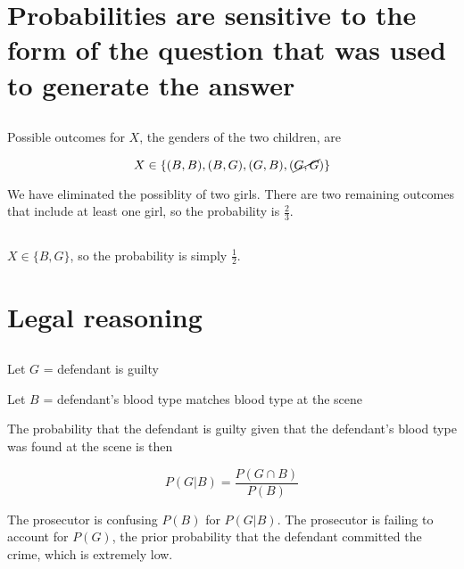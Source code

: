 \documentclass{article}
\begin{document}
\def\ci{\perp\!\!\!\perp}

\section{Probabilities are sensitive to the form of the question that
  was used to generate the answer}

\subsection{}

Possible outcomes for $X$, the genders of the two children, are

\[
X\in \left\{ (B,B), (B,G), (G,B), (\cancel{G,G})\right\}
\]

We have eliminated the possiblity of two girls. There are two
remaining outcomes that include at least one girl, so the probability is $\frac{2}{3}$.

\subsection{}

$X \in \{ B, G \}$, so the probability is simply $\frac{1}{2}$.

\section{Legal reasoning}

\subsection{}

\begin{list}{}{}
\item Let $G$ = defendant is guilty
\item Let $B$ = defendant's blood type matches blood type at the scene
\end{list}

The probability that the defendant is guilty given that the
defendant's blood type was found at the scene is then

\[ P(G|B) = \frac{P(G \cap B)}{P(B)} \]

The prosecutor is confusing $P(B)$ for $P(G|B)$. The prosecutor is failing
to account for $P(G)$, the prior probability that the defendant
committed the crime, which is extremely low.
\end{document}
